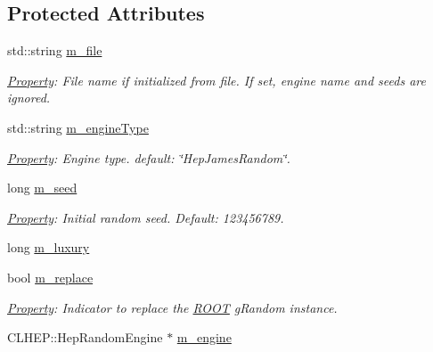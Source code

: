 \subsection*{Protected Attributes}
\begin{DoxyCompactItemize}
\item 
std::string \hyperlink{class_d_d4hep_1_1_simulation_1_1_geant4_random_a0392ac65cdbecdf7aa9663d919246d66}{m\_\-file}
\begin{DoxyCompactList}\small\item\em \hyperlink{class_d_d4hep_1_1_property}{Property}: File name if initialized from file. If set, engine name and seeds are ignored. \item\end{DoxyCompactList}\item 
std::string \hyperlink{class_d_d4hep_1_1_simulation_1_1_geant4_random_a288d4450519a05e0c2360c4994790cce}{m\_\-engineType}
\begin{DoxyCompactList}\small\item\em \hyperlink{class_d_d4hep_1_1_property}{Property}: Engine type. default: \char`\"{}HepJamesRandom\char`\"{}. \item\end{DoxyCompactList}\item 
long \hyperlink{class_d_d4hep_1_1_simulation_1_1_geant4_random_a24193f5a0f19684a176f12a5aedec2b2}{m\_\-seed}
\begin{DoxyCompactList}\small\item\em \hyperlink{class_d_d4hep_1_1_property}{Property}: Initial random seed. Default: 123456789. \item\end{DoxyCompactList}\item 
long \hyperlink{class_d_d4hep_1_1_simulation_1_1_geant4_random_aa74af649720c65fd7e4e9d357e77c01d}{m\_\-luxury}
\item 
bool \hyperlink{class_d_d4hep_1_1_simulation_1_1_geant4_random_a3d14b4420a812cdb4e0965f77e3f5988}{m\_\-replace}
\begin{DoxyCompactList}\small\item\em \hyperlink{class_d_d4hep_1_1_property}{Property}: Indicator to replace the \hyperlink{namespace_r_o_o_t}{ROOT} gRandom instance. \item\end{DoxyCompactList}\item 
CLHEP::HepRandomEngine $\ast$ \hyperlink{class_d_d4hep_1_1_simulation_1_1_geant4_random_aad17696c3d6d9f9953a40e75d8125da6}{m\_\-engine}

\end{DoxyCompactItemize}
